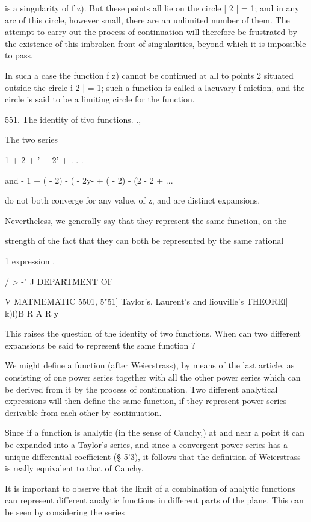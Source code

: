 {{is a singularity of f z). But these points all lie on the circle | 2 |
= 1; and in any arc of this circle, however small, there are an
unlimited number of them. The attempt to carry out the process of
continuation will therefore be frustrated by the existence of this
imbroken front of singularities, beyond which it is impossible to
pass.

In such a case the function f z) cannot be continued at all to points
2 situated outside the circle i 2 | = 1; such a function is called a
lacuvary f miction, and the circle is said to be a limiting circle for
the function.

551. The identity of tivo functions. .,

The two series

1 + 2 + ' + 2' + . . .

and - 1 + ( - 2) - ( - 2y- + ( - 2) - (2 - 2 + ...

do not both converge for any value, of z, and are distinct expansions.

Nevertheless, we generally say that they represent the same function,
on the

strength of the fact that they can both be represented by the same
rational

1 expression .

/ > -" J DEPARTMENT OF

V MATMEMATIC 5501, 5"51] Taylor's, Laurent's and liouville's THEOREl|
k)l)B R A R y

This raises the question of the identity of two functions. When can
two different expansions be said to represent the same function ?

We might define a function (after Weierstrass), by means of the last
article, as consisting of one power series together with all the other
power series which can be derived from it by the process of
continuation. Two different analytical expressions will then define
the same function, if they represent power series derivable from each
other by continuation.

Since if a function is analytic (in the sense of Cauchy,) at
and near a point it can be expanded into a Taylor's series, and since
a convergent power series has a unique differential coefficient (§
5'3), it follows that the definition of Weierstrass is really
equivalent to that of Cauchy.

It is important to observe that the limit of a combination of analytic
functions can represent different analytic functions in different
parts of the plane. This can be seen by considering the series

}}
